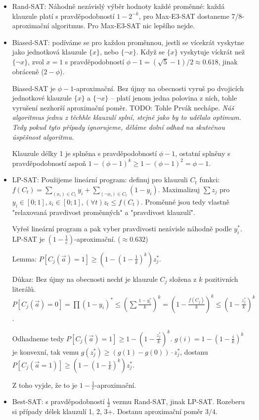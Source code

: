 \documentclass[a4paper,10pt,titlepage]{article} \usepackage[utf8]{inputenc}
\begin{document}
\begin{itemize}
\item Rand-SAT: Náhodně nezávislý výběr hodnoty každé proměnné: každá klauzule
	platí s pravděpodobností $1-2^{-k}$, pro Max-E3-SAT dostaneme
	7/8-aproximační algoritmus. Pro Max-E3-SAT nic lepšího nejde.

\item Biased-SAT: podíváme se pro každou proměnnou, jestli se vícekrát vyskytne
	jako jednotková klauzule $\{x\}$, nebo $\{\neg x\}$. Když se $\{x\}$ vyskytuje
	víckrát než $\{\neg x\}$, zvol $x=1$ s pravděpodobností
	$\phi-1=(\sqrt{5}-1)/2\approx 0.618$, jinak obráceně ($2-\phi$).

	Biased-SAT je $\phi-1$-aproximační.
	Bez újmy na obecnosti vyruš po dvojicích jednotkové klauzule $\{x\}$
	a $\{\neg x\}$ -- platí jenom jedna polovina z nich, tohle vyrušení
	nezhorší aproximační poměr.
	TODO: Tohle Prvák nechápe. \textit{Náš algoritmus jednu z těchhle 
	klauzulí splní, stejně jako by to udělalo optimum. Tedy pokud tyto případy 
	ignorujeme, děláme dolní odhad na skutečnou úspěšnost algoritmu.}

	Klauzule délky 1 je splněna s pravděpodobností $\phi-1$,
	ostatní splněny s pravděpodobností aspoň $1-(\phi-1)^k\geq
	1-(\phi-1)^2=\phi-1$.

\item LP-SAT: Použijeme lineární program:
	definuj pro klauzuli $C_t$ funkci:
	$f(C_t)=\sum_{(x_i)\in C_t} y_i + \sum_{(\neg x_i)\in C_t} (1-y_i)$.
	Maximalizuj $\sum z_j$ pro $y_i\in [0;1], z_i\in [0;1],
	(\forall t) z_t\leq f(C_t)$.
	Proměnné jsou tedy vlastně "relaxovaná pravdivost proměnných" a
	"pravdivost klauzulí".

	Vyřeš lineární program a pak vyber pravdivosti nezávisle náhodně
	podle $y_i^*$.
	LP-SAT je $(1-\frac{1}{e})$-aproximační. ($\approx 0.632$)

	Lemma: $P[C_j(\overrightarrow{a})=1]\geq (1-(1-\frac{1}{k})^k)z_j^*$.

	Důkaz: Bez újmy na obecnosti nechť je klauzule $C_j$ složena
	z $k$ pozitivních literálů. $P[C_j(\overrightarrow{a})=0]=
	\prod(1-y_i)^*\leq
	(\sum{\frac{1-y_i^*}{k}})^k=(1-\frac{f(C_j)}{k})^k\leq
	(1-\frac{z_j^*}{k})^k$.

	Odhadneme tedy $P[C_j(\overrightarrow{a})=1]\geq
	1-(1-\frac{z_j^*}{k})^k$. $g(i)=1-(1-\frac{i}{k})^k$ je konvexní,
	tak vemu $g(z_j^*)\geq (g(1)-g(0))\cdot z_j^*$, dostanu
	$P[C_j(\overrightarrow{a}=1)]\geq (1-(1-\frac{1}{k})^k)z_j^*$.

	Z toho vyjde, že to je $1-\frac{1}{e}$-aproximační.

\item Best-SAT: s pravděpodobností $\frac{1}{2}$ vezmu Rand-SAT, jinak LP-SAT.
	Rozeberu si případy délek klauzulí 1, 2, 3+.
	Dostanu aproximační poměr $3/4$.
\end{itemize}
\end{document}
